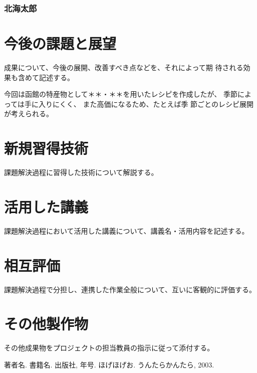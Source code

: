 \documentclass[openany,11pt,papersize]{jsbook}
\begin{document}

\subsection{北海太郎}




\chapter{今後の課題と展望}
\begin{hissu}
成果について、今後の展開、改善すべき点などを、それによって期
待される効果も含めて記述する。
\end{hissu}

今回は函館の特産物として＊＊・＊＊を用いたレシピを作成したが、
季節によっては手に入りにくく、 また高価になるため、たとえば季
節ごとのレシピ展開が考えられる。


\begin{appendix}

\chapter{新規習得技術}
\begin{hissu}
課題解決過程に習得した技術について解説する。
\end{hissu}

\chapter{活用した講義}
\begin{hissu}
課題解決過程において活用した講義について、講義名・活用内容を記述する。
\end{hissu}

\chapter{相互評価}
\begin{hissu}
課題解決過程で分担し、連携した作業全般について、互いに客観的に評価する。
\end{hissu}

\chapter{その他製作物}
\begin{hissu}
その他成果物をプロジェクトの担当教員の指示に従って添付する。
\end{hissu}

\end{appendix}



\begin{thebibliography}{9}
  著者名. 書籍名. 出版社,  年号.
  ほげほげお. うんたらかんたら,  2003.
\end{thebibliography}
\end{document}
